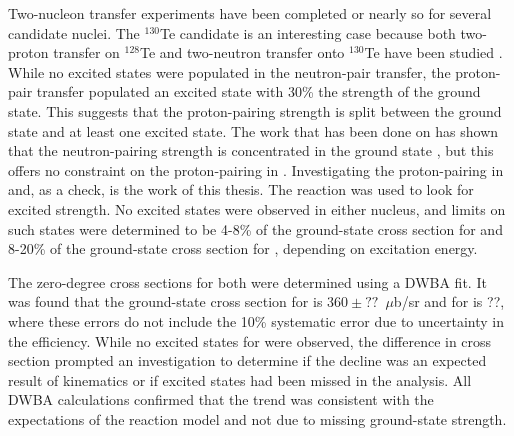 Two-nucleon transfer experiments have been completed or nearly so for several candidate nuclei.  The $^{130}$Te candidate is an interesting case because both two-proton transfer on $^{128}$Te and two-neutron transfer onto $^{130}$Te have been studied \cite{protonPairsTellurium,neutronPairsTellurium}.  While no excited \zp states were populated in the neutron-pair transfer, the proton-pair transfer populated an excited \zp state with 30\% the strength of the ground state.  This suggests that the proton-pairing strength is split between the ground state and at least one excited \zp state.   The work that has been done on  has shown that the neutron-pairing strength is concentrated in the ground state \cite{neutronPairsGermanium}, but this offers no constraint on the proton-pairing in .  Investigating the proton-pairing in  and, as a check,  is the work of this thesis.  The reaction \reaction was used to look for excited \zp strength.  No excited \zp states were observed in either nucleus, and limits on such states were determined to be 4-8\% of the ground-state cross section for  and 8-20\% of the ground-state cross section for , depending on excitation energy.  

The zero-degree cross sections for both \GeTargets were determined using a DWBA fit.  It was found that the ground-state cross section for  is $360\pm??$~$\mu$b/sr and for  is ??, where these errors do not include the 10\% systematic error due to uncertainty in the efficiency.  While no excited states for  were observed, the difference in cross section prompted an investigation to determine if the decline was an expected result of kinematics or if excited \zp states had been missed in the analysis.  All DWBA calculations confirmed that the trend was consistent with the expectations of the reaction model and not due to missing ground-state \zp strength. 


